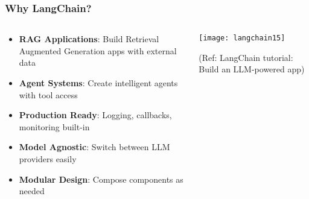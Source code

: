 \begin{frame}[fragile]\frametitle{Why LangChain?}

  \begin{columns}
    \begin{column}{0.5\textwidth}
      \begin{itemize}
        \item \textbf{RAG Applications}: Build Retrieval Augmented Generation apps with external data
        \item \textbf{Agent Systems}: Create intelligent agents with tool access
        \item \textbf{Production Ready}: Logging, callbacks, monitoring built-in
        \item \textbf{Model Agnostic}: Switch between LLM providers easily
        \item \textbf{Modular Design}: Compose components as needed
      \end{itemize}
    \end{column}
    \begin{column}{0.5\textwidth}
			\begin{center}
			\texttt{[image: langchain15]}
			\end{center}	  
			{\tiny (Ref: LangChain tutorial: Build an LLM-powered app)}
    \end{column}
  \end{columns}

\end{frame}

